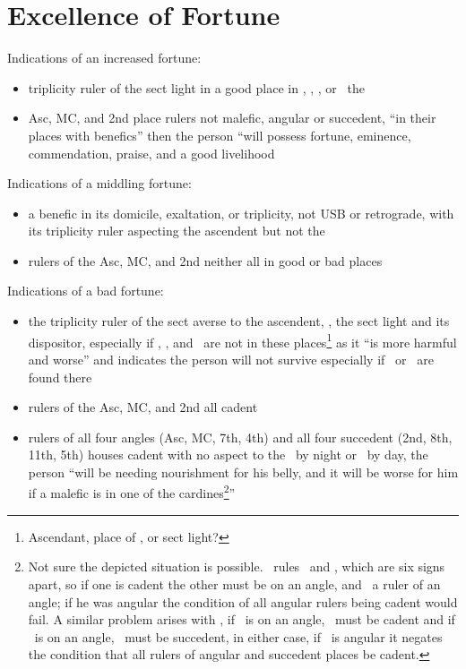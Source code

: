 \section{Excellence of Fortune}
Indications of an increased fortune:
\begin{itemize}[topsep=0em,itemsep=0em]
\item triplicity ruler of the sect light in a good place in \Conjunction, \Opposition, \Trine, or \Square\, the \Moon

\item Asc, MC, and 2nd place rulers not malefic, angular or succedent, ``in their places with benefics'' then the person ``will possess fortune, eminence, commendation, praise, and a good livelihood
\end{itemize}

Indications of a middling fortune:
\begin{itemize}[topsep=0em,itemsep=0em]
\item a benefic in its domicile, exaltation, or triplicity, not USB or retrograde, with its triplicity ruler aspecting the ascendent but not the \Moon

\item rulers of the Asc, MC, and 2nd neither all in good or bad places
\end{itemize}

Indications of a bad fortune:
\begin{itemize}[topsep=0em,itemsep=0em]
\item the triplicity ruler of the sect averse to the ascendent, \Moon, the sect light and its dispositor, especially if \Jupiter, \Venus, and \Mercury\, are not in these places\footnote{Ascendant, place of \Moon, or sect light?} as it ``is more harmful and worse'' and indicates the person will not survive especially if \Saturn\, or \Mars\, are found there

\item rulers of the Asc, MC, and 2nd all cadent

\item rulers of all four angles (Asc, MC, 7th, 4th) and all four succedent (2nd, 8th, 11th, 5th) houses cadent with no aspect to the \Moon\, by night or \Sun\, by day, the person ``will be needing nourishment for his belly, and it will be worse for him if a malefic is in one of the cardines\footnote{Not sure the depicted situation is possible. \Mars\, rules \Aries\, and \Scorpio, which are six signs apart, so if one is cadent the other must be on an angle, and \Mars\, a ruler of an angle; if he was angular the condition of all angular rulers being cadent would fail. A similar problem arises with \Saturn, if \Aquarius\, is on an angle, \Capricorn\, must be cadent and if \Capricorn\, is on an angle, \Aquarius\, must be succedent, in either case, if \Saturn\, is angular it negates the condition that all rulers of angular and succedent places be cadent.}''
\end{itemize}